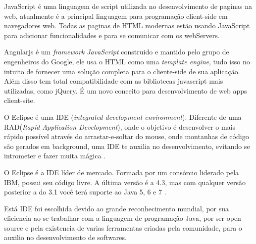 
JavaScript é uma linguagem de script utilizada no desenvolvimento de paginas na web, atualmente é a principal linguagem para programação client-side em navegadores web. Todas as paginas de HTML modernas estão usando JavaScript para adicionar funcionalidades e para se comunicar com os webServers\cite{javascript}.\par

Angularjs é um \textit{framework JavaScript} construido e mantido pelo grupo de engenheiros do Google, ele usa o HTML como uma \textit{template engine}, tudo isso no intuito de fornecer uma solução completa para o cliente-side de sua aplicação. Além disso tem total compatibilidade com as bibliotecas javascript mais utilizadas, como jQuery. É um novo conceito para desenvolvimento de web apps client-site.\cite{angularjs}\par


O Eclipse é uma IDE (\textit{integrated development environment}). Diferente de uma RAD(\textit{Rapid Application Development}), onde o objetivo é desenvolver o mais rápido possível através do arrastar-e-soltar do mouse, onde montanhas de código são gerados em background, uma IDE te auxilia no desenvolvimento, evitando se intrometer e fazer muita mágica \cite{caelum}.\par

O Eclipse é a IDE líder de mercado. Formada por um consórcio liderado pela IBM, possui seu código livre. A última versão é a 4.3, mas com qualquer versão posterior a do 3.1 você terá suporte ao Java 5, 6 e 7 \cite{caelum}.\par

Está IDE foi escolhida devido ao grande reconhecimento mundial, por sua eficiencia ao se trabalhar com a linguagem de programação Java, por ser open-source e pela existencia de varias ferramentas criadas pela comunidade, para o auxilio no desenvolvimento de softwares.\par